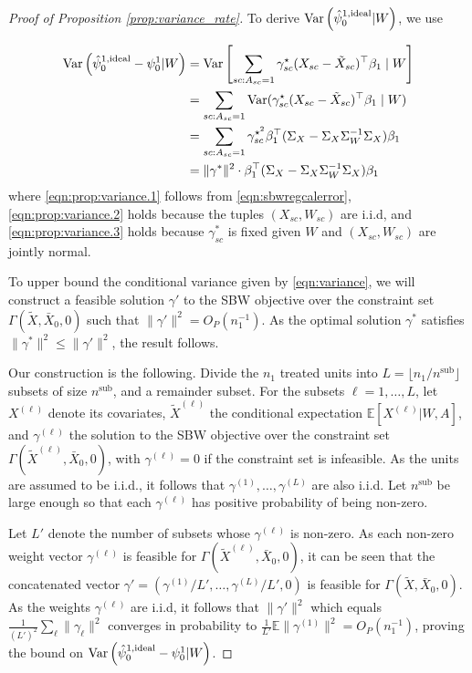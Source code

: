 \begin{proof}[Proof of Proposition \ref{prop:variance_rate}] 
To derive $\operatorname{Var}\left(\hat{\psi}_0^{1,\textup{ideal}} | W\right)$, we use

\begin{align}
\operatorname{Var}\left(\hat{\psi}_0^{1,\textup{ideal}} - \psi_0^1 | W\right) &= \operatorname{Var}\left[\sum_{sc: A_{sc} = 1}\gamma_{sc}^\star(X_{sc} - \tilde{X}_{sc})^\top\beta_1 \mid W\right] \label{eqn:prop:variance.1}\\
 &= \sum_{sc: A_{sc} = 1} \operatorname{Var}(\gamma_{sc}^\star(X_{sc} - \tilde{X}_{sc})^\top\beta_1 \mid W) \label{eqn:prop:variance.2}\\
 &= \sum_{sc: A_{sc} = 1} \gamma_{sc}^{\star^2}\beta_1^\top (\Sigma_{X} - \Sigma_{X}\Sigma_{W}^{-1}\Sigma_{X})\beta_1  \label{eqn:prop:variance.3}\\
& = \|\gamma^*\|^2 \cdot \beta_1^\top (\Sigma_{X} - \Sigma_{X}\Sigma_{W}^{-1}\Sigma_{X})\beta_1 \label{eqn:variance}
\end{align}
%
where \eqref{eqn:prop:variance.1} follows from \eqref{eqn:sbwregcalerror}, \eqref{eqn:prop:variance.2} holds because the tuples $(X_{sc}, W_{sc})$ are i.i.d, and \eqref{eqn:prop:variance.3} holds because $\gamma_{sc}^*$ is fixed given $W$ and $(X_{sc}, W_{sc})$ are jointly normal. 

To upper bound the conditional variance given by \eqref{eqn:variance}, we will construct a feasible solution $\gamma'$ to the SBW objective over the constraint set $\Gamma(\tilde{X}, \bar{X}_0, 0)$ such that $\|\gamma'\|^2 = O_P(n_1^{-1})$. As the optimal solution $\gamma^*$ satisfies $\|\gamma^*\|^2 \leq \|\gamma'\|^2$, the result follows.

Our construction is the following. Divide the $n_1$ treated units into $L = \lfloor n_1/n^{\text{sub}} \rfloor$ subsets of size $n^{\text{sub}}$, and a remainder subset. For the subsets $\ell=1,\ldots,L$, let $X^{(\ell)}$ denote its covariates, $\tilde{X}^{(\ell)}$ the conditional expectation $\mathbb{E}[X^{(\ell)}|W, A]$, and  $\gamma^{(\ell)}$ the solution to the SBW objective over the constraint set $\Gamma(\tilde{X}^{(\ell)}, \bar{X}_0, 0)$, with $\gamma^{(\ell)}=0$ if the constraint set is infeasible. As the units are assumed to be i.i.d., it follows that $\gamma^{(1)}, \ldots, \gamma^{(L)}$ are also i.i.d. Let $n^{\text{sub}}$ be large enough so that each $\gamma^{(\ell)}$ has positive probability of being non-zero. 

Let $L'$ denote the number of subsets whose $\gamma^{(\ell)}$ is non-zero. As each non-zero weight vector $\gamma^{(\ell)}$ is feasible for $\Gamma(\tilde{X}^{(\ell)}, \bar{X}_0, 0)$, it can be seen that the concatenated vector $\gamma' = (\gamma^{(1)}/L', \ldots, \gamma^{(L)}/L', 0)$ is feasible for $\Gamma(\tilde{X},\bar{X}_0,0)$. As the weights $\gamma^{(\ell)}$ are i.i.d, it follows that $\| \gamma'\|^2$ which equals $\frac{1}{(L')^2} \sum_\ell \|\gamma_\ell\|^2$  converges in probability to $\frac{1}{L'} \mathbb{E}\|\gamma^{(1)}\|^2 = O_P(n_1^{-1})$, proving the bound on $\operatorname{Var}\left(\hat{\psi}_0^{1,\textup{ideal}} - \psi_0^1 | W\right)$.


\end{proof}
